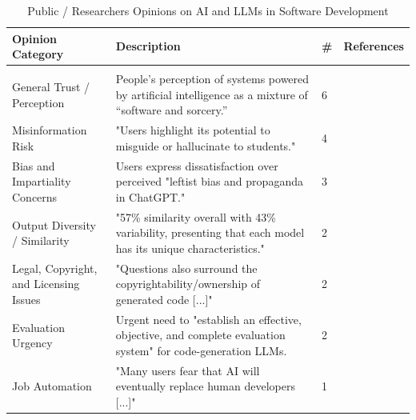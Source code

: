 {\small
\begin{longtable}{>{\raggedright\arraybackslash}p{3cm} p{9cm}  p{0.2cm} p{1.8cm}}
\caption{Public / Researchers Opinions on AI and LLMs in Software Development}
\label{tab:stakeholder_opinions_public} \\

\toprule
\textbf{Opinion Category} & \textbf{Description} & \textbf{\#} & \textbf{References} \\
\midrule
\endfirsthead

\midrule
\multicolumn{4}{r}{\textit{Continued on next page}}\\
\bottomrule
\endfoot

\bottomrule
\endlastfoot

General Trust / Perception & People’s perception of systems powered by artificial intelligence as a mixture of “software and sorcery.” \cite{Ahmed:2025ai} & 6 & \cite{Bai:2025ci, Ahmed:2025ai, Basha:2025tt, Pendyala:2025pi, Zamfiroiu:2025ec, Ramos:2025aa} \\ \addlinespace
Misinformation Risk & "Users highlight its potential to misguide or hallucinate to students." \cite{Basha:2025tt} & 4 & \cite{Jabrw:2025ss, Durrani:2024ad, Basha:2025tt, Banh:2025cf} \\ \addlinespace
Bias and Impartiality Concerns & Users express dissatisfaction over perceived "leftist bias and propaganda in ChatGPT." \cite{Basha:2025tt} & 3 & \cite{Ramos:2025aa, Basha:2025tt, Ahmed:2025ai} \\ \addlinespace
Output Diversity / Similarity & "57\% similarity overall with 43\% variability, presenting that each model has its unique characteristics." \cite{Kim:2025ao} & 2 & \cite{Zhang:2025ea, Kim:2025ao} \\ \addlinespace
Legal, Copyright, and Licensing Issues & "Questions also surround the copyrightability/ownership of generated code [...]" \cite{Ahmed:2025ai} & 2 & \cite{Ahmed:2025ai, Basha:2025tt} \\ \addlinespace
Evaluation Urgency & Urgent need to "establish an effective, objective, and complete evaluation system" for code-generation LLMs. \cite{Ahmed:2025ai} & 2 & \cite{Ahmed:2025ai, Pendyala:2025pi} \\ \addlinespace
Job Automation & "Many users fear that AI will eventually replace human developers [...]" \cite{Basha:2025tt} & 1 & \cite{Basha:2025tt} \\

\end{longtable}
}

